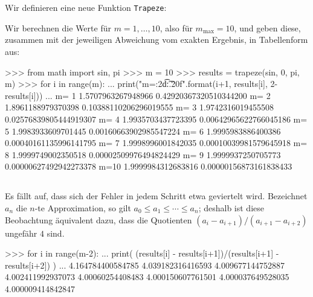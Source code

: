 \section{}
\label{section: better trapeze}





\subsection{}

Wir definieren eine neue Funktion \texttt{Trapeze}:



Wir berechnen die Werte für $m = 1, \dotsc, 10$, also für $m_{\text{max}} = 10$, und geben diese, zusammen mit der jeweiligen Abweichung vom exakten Ergebnis, in Tabellenform aus:

\begin{consoleoutput}
>>> from math import sin, pi
>>> m = 10
>>> results = trapeze(sin, 0, pi, m)
>>> for i in range(m):
...     print("m={:2d}\t{}\t{:.20f}".format(i+1, results[i], 2-results[i]))
... 
m= 1    1.5707963267948966      0.42920367320510344200
m= 2    1.8961188979370398      0.10388110206296019555
m= 3    1.9742316019455508      0.02576839805444919307
m= 4    1.9935703437723395      0.00642965622766045186
m= 5    1.9983933609701445      0.00160663902985547224
m= 6    1.9995983886400386      0.00040161135996141795
m= 7    1.9998996001842035      0.00010039981579645918
m= 8    1.9999749002350518      0.00002509976494824429
m= 9    1.9999937250705773      0.00000627492942273378
m=10    1.9999984312683816      0.00000156873161838433
\end{consoleoutput}




\subsection{}

Es fällt auf, dass sich der Fehler in jedem Schritt etwa geviertelt wird.
Bezeichnet $a_n$ die $n$-te Approximation, so gilt $a_0 \leq a_1 \leq \dotsb \leq a_n$; deshalb ist diese Beobachtung äquivalent dazu, dass die Quotienten $(a_i - a_{i+1})/(a_{i+1} - a_{i+2})$ ungefähr $4$ sind.

\begin{consoleoutput}
>>> for i in range(m-2):
...     print( (results[i] - results[i+1])/(results[i+1] - results[i+2]) )
... 
4.164784400584785
4.039182316416593
4.009677144752887
4.002411992937073
4.00060254408483
4.000150607761501
4.000037649528035
4.000009414842847
\end{consoleoutput}


